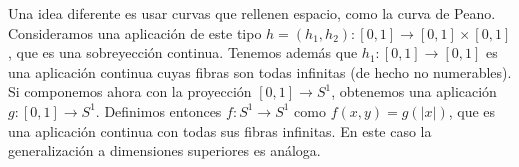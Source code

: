 \documentclass[twoside]{article}
\begin{document}
\begin{solucion}
\vspace{0.5cm}

Una idea diferente es usar curvas que rellenen espacio, como la curva de Peano. Consideramos una aplicación de este tipo $h=(h_1,h_2):[0,1]\to [0,1]\times[0,1]$, que es una sobreyección continua. Tenemos además que $h_1:[0,1]\to [0,1]$ es una aplicación continua cuyas fibras son todas infinitas (de hecho no numerables). Si componemos ahora con la proyección $[0,1]\to S^1$, obtenemos una aplicación $g:[0,1]\to S^1$. Definimos entonces $f:S^1\to S^1$ como $f(x,y)=g(|x|)$, que es una aplicación continua con todas sus fibras infinitas. En este caso la generalización a dimensiones superiores es análoga. 
\end{solucion}

\newpage


%
\end{document}
